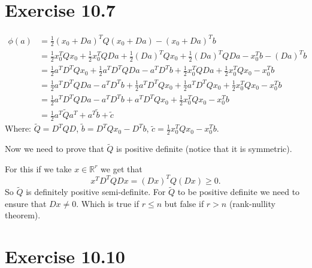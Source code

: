 \documentclass{article}
\begin{document}
\section*{Exercise 10.7}
\begin{align*}
	\phi(a)&=\frac{1}{2}(x_0+Da)^TQ(x_0+Da)-(x_0+Da)^Tb\\
	&=\frac{1}{2}x_0^TQx_0+\frac{1}{2}x_0^TQDa+\frac{1}{2}(Da)^TQx_0+\frac{1}{2}(Da)^TQDa -x_0^Tb-(Da)^Tb\\
	&=\frac{1}{2}a^TD^TQx_0+\frac{1}{2}a^TD^TQDa-a^TD^Tb+\frac{1}{2}x_0^TQDa + \frac{1}{2}x_0^TQx_0-x_0^Tb\\
	&=\frac{1}{2}a^TD^TQDa-a^TD^Tb+\frac{1}{2}a^TD^TQx_0+\frac{1}{2}a^TD^TQx_0 + \frac{1}{2}x_0^TQx_0-x_0^Tb\\
	&=\frac{1}{2}a^TD^TQDa-a^TD^Tb+a^TD^TQx_0+ \frac{1}{2}x_0^TQx_0-x_0^Tb\\
	&=\frac{1}{2}a^T\tilde{Q}a^T+a^T\tilde{b}+\tilde{c}
\end{align*}
Where: $\tilde{Q}=D^TQD$, $\tilde{b}=D^TQx_0-D^Tb$, $\tilde{c}=\frac{1}{2}x_0^TQx_0-x_0^Tb$.

Now we need to prove that $\tilde{Q}$ is positive definite (notice that it is symmetric).

For this if we take $x\in\mathbb{R}^r$ we get that
\[
	x^TD^TQDx=(Dx)^TQ(Dx)\geq 0.
\]
So $\tilde{Q}$ is definitely positive semi-definite. For $\tilde{Q}$ to be
positive definite we need to ensure that $Dx\neq 0$. Which is true if $r\leq n$
but false if $r>n$ (rank-nullity theorem).
\section*{Exercise 10.10}
\end{document}
